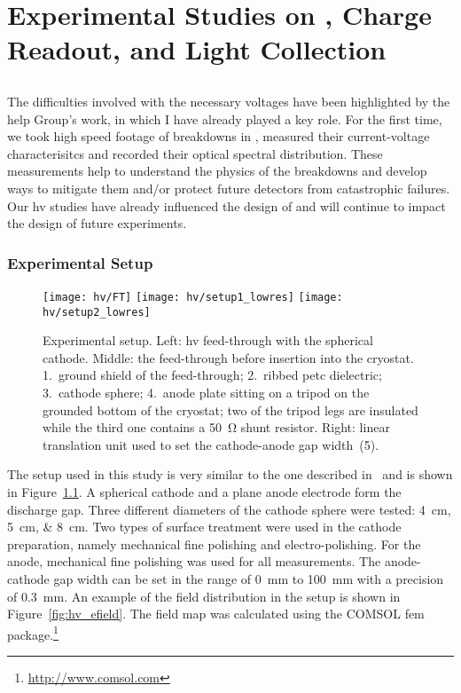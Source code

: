 \chapter{Experimental Studies on , Charge Readout, and Light Collection}
\label{chap:studies}


\section{}
\label{sec:studies_hv}

The difficulties involved with the necessary voltages have been highlighted by the \gls{help} Group’s work, in which I have already played a key role\cite{breakdown_16}.
For the first time, we took high speed footage of breakdowns in \lar{}, measured their current-voltage characterisitcs and recorded their optical spectral distribution.
These measurements help to understand the physics of the breakdowns and develop ways to mitigate them and/or protect future detectors from catastrophic failures.
Our \gls{hv} studies have already influenced the design of \uboone{} and will continue to impact the design of future experiments.


\subsection{Experimental Setup}
\label{sec:studies_hv_setup}

\begin{figure}[htb]
	\centering	
	\texttt{[image: hv/FT]}
	\texttt{[image: hv/setup1\_lowres]}
	\texttt{[image: hv/setup2\_lowres]}
	\caption[ test setup]{
		Experimental setup.
		Left: \acrshort{hv} feed-through with the spherical cathode.
		Middle: the feed-through before insertion into the cryostat.
		1.~ground shield of the feed-through; 2.~ribbed \acrshort{petc} dielectric; 3.~cathode sphere; 4.~anode plate sitting on a tripod on the grounded bottom of the cryostat; two of the tripod legs are insulated while the third one contains a \SI{50}{\ohm} shunt resistor.
		Right: linear translation unit used to set the cathode-anode gap width~(5).
	}
	\label{fig:hv_setup1}
\end{figure}

The setup used in this study is very similar to the one described in~\cite{breakdown_14} and is shown in Figure~\ref{fig:hv_setup1}.
A spherical cathode and a plane anode electrode form the discharge gap.
Three different diameters of the cathode sphere were tested: \SIlist{4; 5; 8}{\centi\metre}.
Two types of surface treatment were used in the cathode preparation, namely mechanical fine polishing and electro-polishing.
For the anode, mechanical fine polishing was used for all measurements.
The anode-cathode gap width can be set in the range of \SI{0}{\milli\metre} to \SI{100}{\milli\metre} with a precision of \SI{0.3}{\milli\metre}.
An example of the field distribution in the setup is shown in Figure~\ref{fig:hv_efield}.
The field map was calculated using the COMSOL \gls{fem} package.\footnote{\url{http://www.comsol.com}}

